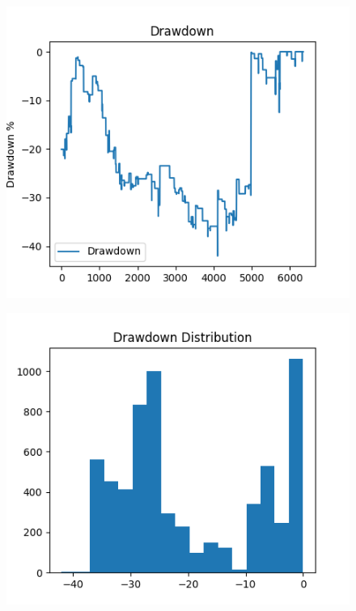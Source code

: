 \documentclass[a4paper]{article}
\begin{document}
\begin{figure}[H]
    \begin{center}
        \includegraphics{../generated/drawdown.png}
    \end{center}
\end{figure}

\begin{figure}[H]
    \begin{center}
        \includegraphics{../generated/drawdown_dist.png}
    \end{center}
\end{figure}
\end{document}
